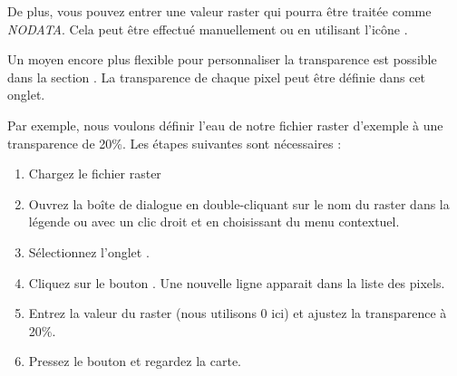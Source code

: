 De plus, vous pouvez entrer une valeur raster qui pourra être traitée comme {\em NODATA}. Cela peut être effectué manuellement ou en utilisant l'icône .

Un moyen encore plus flexible pour personnaliser la transparence est possible dans la section .
La transparence de chaque pixel peut être définie dans cet onglet.

Par exemple, nous voulons définir l'eau de notre fichier raster d'exemple
 à une transparence de 20\%. Les étapes suivantes sont nécessaires :
\begin{enumerate}
\item Chargez le fichier raster 
 \item Ouvrez la boîte de dialogue  en double-cliquant sur le nom du raster dans la légende ou avec un clic droit et en choisissant
 du menu contextuel.
 \item Sélectionnez l'onglet .
  \item \label{enum:add} Cliquez sur le bouton
. Une nouvelle ligne apparait dans la liste des pixels.
 \item \label{enum:transp} Entrez la valeur du raster (nous utilisons 0 ici)
et ajustez la transparence à 20\%.
 \item Pressez le bouton  et regardez la carte.
\end{enumerate}

